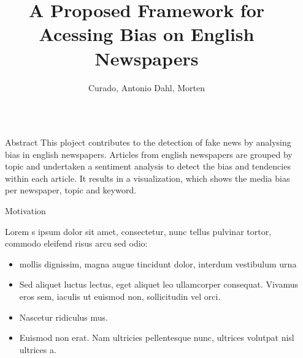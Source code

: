 \documentclass[final,8pt]{beamer} %
\title{A Proposed Framework for Acessing Bias on English Newspapers {\emoji[ios]{1F4F0}}} %
\author{Curado, Antonio  {\emoji[ios]{1F9E0}}  Dahl, Morten} %
\institute{Masters in Advanced Analytics @ Nova IMS} %
\newlength{\sepwid}
\newlength{\onecolwid}
\begin{document}

\setlength{\belowcaptionskip}{2ex} %
\setlength\belowdisplayshortskip{2ex} %

\begin{frame}[t] %

\begin{columns}[t] %

\begin{column}{\sepwid}\end{column} %

\begin{column}{\onecolwid} %



\begin{block}{Abstract}
This ploject contributes to the detection of fake news by analysing bias in english newspapers. Articles from english newspapers are grouped by topic and undertaken a sentiment analysis to detect  the bias and tendencies within each article. It results in a visualization, which shows the media bias per newspaper, topic and keyword.

\end{block}



\begin{block}{Motivation {}}

    Lorem s ipsum dolor sit amet, consectetur, nunc tellus pulvinar tortor, commodo eleifend risus arcu sed odio:
    \begin{itemize}
        \item mollis dignissim, magna augue tincidunt dolor, interdum vestibulum urna
        \item Sed aliquet luctus lectus, eget aliquet leo ullamcorper consequat. Vivamus eros sem, iaculis ut euismod non, sollicitudin vel orci.
        \item Nascetur ridiculus mus.  
        \item Euismod non erat. Nam ultricies pellentesque nunc, ultrices volutpat nisl ultrices a.
    \end{itemize}


\end{block}
\end{column}
\end{columns}
\end{frame}
\end{document}
